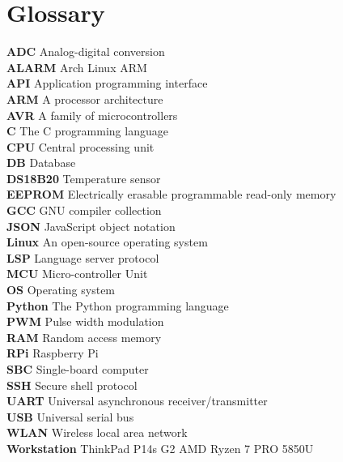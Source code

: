 \section*{Glossary}%
\label{sec:glossary}

\textbf{ADC} Analog-digital conversion \\
\textbf{ALARM} Arch Linux ARM \\
\textbf{API} Application programming interface \\
\textbf{ARM} A processor architecture \\
\textbf{AVR} A family of microcontrollers \\
\textbf{C} The C programming language \\
\textbf{CPU} Central processing unit \\
\textbf{DB} Database \\
\textbf{DS18B20} Temperature sensor \\
\textbf{EEPROM} Electrically erasable programmable read-only memory \\
\textbf{GCC} GNU compiler collection \\
\textbf{JSON} JavaScript object notation \\
\textbf{Linux} An open-source operating system \\
\textbf{LSP} Language server protocol \\
\textbf{MCU} Micro-controller Unit \\
\textbf{OS} Operating system \\
\textbf{Python} The Python programming language \\
\textbf{PWM} Pulse width modulation \\
\textbf{RAM} Random access memory \\
\textbf{RPi} Raspberry Pi \\
\textbf{SBC} Single-board computer \\
\textbf{SSH} Secure shell protocol \\
\textbf{UART} Universal asynchronous receiver/transmitter \\
\textbf{USB} Universal serial bus \\
\textbf{WLAN} Wireless local area network \\
\textbf{Workstation} ThinkPad P14s G2 AMD Ryzen 7 PRO 5850U \\
